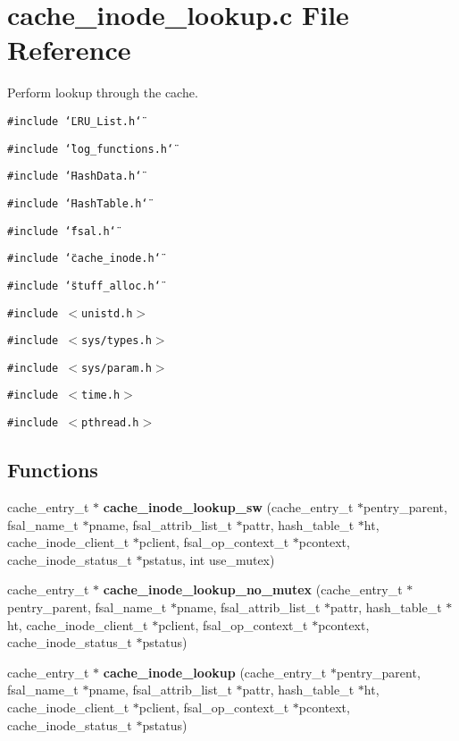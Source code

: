 \section{cache\_\-inode\_\-lookup.c File Reference}
\label{cache__inode__lookup_8c}
Perform lookup through the cache. 

{\tt \#include \char`\"{}LRU\_\-List.h\char`\"{}}\par
{\tt \#include \char`\"{}log\_\-functions.h\char`\"{}}\par
{\tt \#include \char`\"{}Hash\-Data.h\char`\"{}}\par
{\tt \#include \char`\"{}Hash\-Table.h\char`\"{}}\par
{\tt \#include \char`\"{}fsal.h\char`\"{}}\par
{\tt \#include \char`\"{}cache\_\-inode.h\char`\"{}}\par
{\tt \#include \char`\"{}stuff\_\-alloc.h\char`\"{}}\par
{\tt \#include $<$unistd.h$>$}\par
{\tt \#include $<$sys/types.h$>$}\par
{\tt \#include $<$sys/param.h$>$}\par
{\tt \#include $<$time.h$>$}\par
{\tt \#include $<$pthread.h$>$}\par
\subsection*{Functions}
\begin{CompactItemize}
\item 
cache\_\-entry\_\-t $\ast$ {\bf cache\_\-inode\_\-lookup\_\-sw} (cache\_\-entry\_\-t $\ast$pentry\_\-parent, fsal\_\-name\_\-t $\ast$pname, fsal\_\-attrib\_\-list\_\-t $\ast$pattr, hash\_\-table\_\-t $\ast$ht, cache\_\-inode\_\-client\_\-t $\ast$pclient, fsal\_\-op\_\-context\_\-t $\ast$pcontext, cache\_\-inode\_\-status\_\-t $\ast$pstatus, int use\_\-mutex)
\item 
cache\_\-entry\_\-t $\ast$ {\bf cache\_\-inode\_\-lookup\_\-no\_\-mutex} (cache\_\-entry\_\-t $\ast$pentry\_\-parent, fsal\_\-name\_\-t $\ast$pname, fsal\_\-attrib\_\-list\_\-t $\ast$pattr, hash\_\-table\_\-t $\ast$ht, cache\_\-inode\_\-client\_\-t $\ast$pclient, fsal\_\-op\_\-context\_\-t $\ast$pcontext, cache\_\-inode\_\-status\_\-t $\ast$pstatus)
\item 
cache\_\-entry\_\-t $\ast$ {\bf cache\_\-inode\_\-lookup} (cache\_\-entry\_\-t $\ast$pentry\_\-parent, fsal\_\-name\_\-t $\ast$pname, fsal\_\-attrib\_\-list\_\-t $\ast$pattr, hash\_\-table\_\-t $\ast$ht, cache\_\-inode\_\-client\_\-t $\ast$pclient, fsal\_\-op\_\-context\_\-t $\ast$pcontext, cache\_\-inode\_\-status\_\-t $\ast$pstatus)
\end{CompactItemize}


